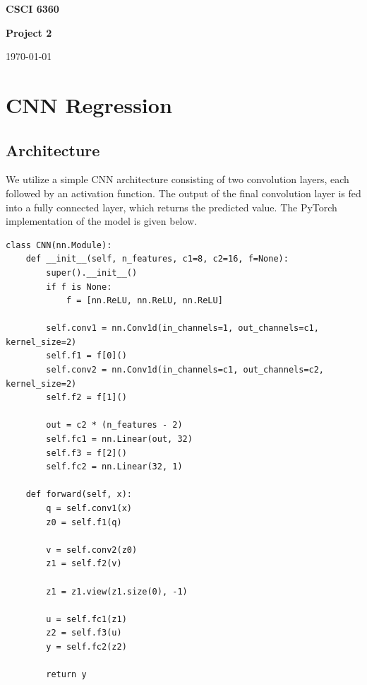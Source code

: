\documentclass[11pt]{article}
\date{}
\begin{document}
\begin{center} {\LARGE\textbf{{CSCI 6360}}}\end{center}
\begin{center}{\Large \textbf{Project 2}}\end{center}
\begin{center} \date{\today} \today \end{center}
    
\vspace{.1in}

\section*{CNN Regression}

\subsection{Architecture}
We utilize a simple CNN architecture consisting of two convolution layers, each followed by an activation function. The output of the final convolution layer is fed into a fully connected layer, which returns the predicted value. The PyTorch implementation of the model is given below.

\begin{verbatim}
class CNN(nn.Module):
    def __init__(self, n_features, c1=8, c2=16, f=None):
        super().__init__()
        if f is None:
            f = [nn.ReLU, nn.ReLU, nn.ReLU]
            
        self.conv1 = nn.Conv1d(in_channels=1, out_channels=c1, kernel_size=2)
        self.f1 = f[0]()
        self.conv2 = nn.Conv1d(in_channels=c1, out_channels=c2, kernel_size=2)
        self.f2 = f[1]()

        out = c2 * (n_features - 2)
        self.fc1 = nn.Linear(out, 32)
        self.f3 = f[2]()
        self.fc2 = nn.Linear(32, 1)

    def forward(self, x):
        q = self.conv1(x)
        z0 = self.f1(q)
        
        v = self.conv2(z0)
        z1 = self.f2(v)

        z1 = z1.view(z1.size(0), -1)
        
        u = self.fc1(z1)
        z2 = self.f3(u)
        y = self.fc2(z2)
        
        return y
\end{verbatim}
\end{document}
